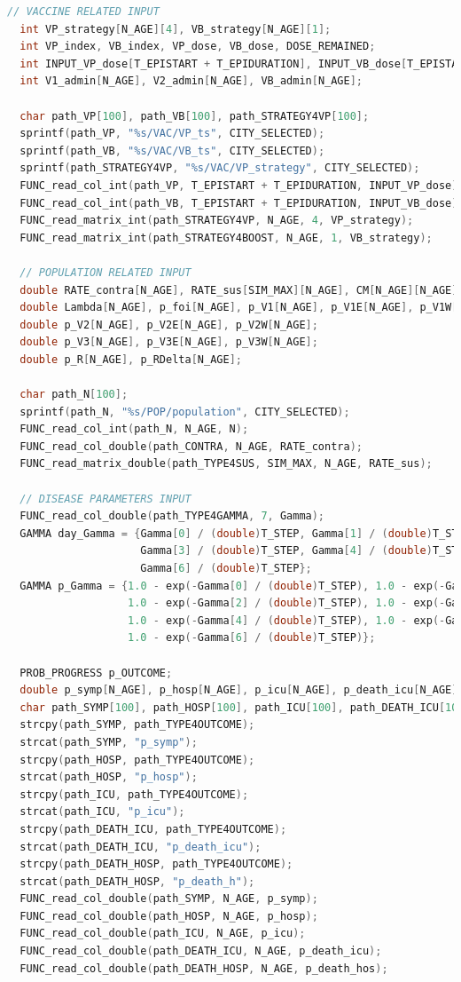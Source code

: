 \documentclass[bwprint]{gmcmthesis}
\numberwithin{figure}{section}
\begin{document}
\begin{lstlisting}[language=C]
  // VACCINE RELATED INPUT
  int VP_strategy[N_AGE][4], VB_strategy[N_AGE][1];
  int VP_index, VB_index, VP_dose, VB_dose, DOSE_REMAINED;
  int INPUT_VP_dose[T_EPISTART + T_EPIDURATION], INPUT_VB_dose[T_EPISTART + T_EPIDURATION];
  int V1_admin[N_AGE], V2_admin[N_AGE], VB_admin[N_AGE];

  char path_VP[100], path_VB[100], path_STRATEGY4VP[100];
  sprintf(path_VP, "%s/VAC/VP_ts", CITY_SELECTED);
  sprintf(path_VB, "%s/VAC/VB_ts", CITY_SELECTED);
  sprintf(path_STRATEGY4VP, "%s/VAC/VP_strategy", CITY_SELECTED);
  FUNC_read_col_int(path_VP, T_EPISTART + T_EPIDURATION, INPUT_VP_dose);
  FUNC_read_col_int(path_VB, T_EPISTART + T_EPIDURATION, INPUT_VB_dose);
  FUNC_read_matrix_int(path_STRATEGY4VP, N_AGE, 4, VP_strategy);
  FUNC_read_matrix_int(path_STRATEGY4BOOST, N_AGE, 1, VB_strategy);

  // POPULATION RELATED INPUT
  double RATE_contra[N_AGE], RATE_sus[SIM_MAX][N_AGE], CM[N_AGE][N_AGE], CM4Beta[N_AGE][N_AGE], Gamma[7];
  double Lambda[N_AGE], p_foi[N_AGE], p_V1[N_AGE], p_V1E[N_AGE], p_V1W[N_AGE];
  double p_V2[N_AGE], p_V2E[N_AGE], p_V2W[N_AGE];
  double p_V3[N_AGE], p_V3E[N_AGE], p_V3W[N_AGE];
  double p_R[N_AGE], p_RDelta[N_AGE];

  char path_N[100];
  sprintf(path_N, "%s/POP/population", CITY_SELECTED);
  FUNC_read_col_int(path_N, N_AGE, N);
  FUNC_read_col_double(path_CONTRA, N_AGE, RATE_contra);
  FUNC_read_matrix_double(path_TYPE4SUS, SIM_MAX, N_AGE, RATE_sus);

  // DISEASE PARAMETERS INPUT
  FUNC_read_col_double(path_TYPE4GAMMA, 7, Gamma);
  GAMMA day_Gamma = {Gamma[0] / (double)T_STEP, Gamma[1] / (double)T_STEP, Gamma[2] / (double)T_STEP,
                     Gamma[3] / (double)T_STEP, Gamma[4] / (double)T_STEP, Gamma[5] / (double)T_STEP,
                     Gamma[6] / (double)T_STEP};
  GAMMA p_Gamma = {1.0 - exp(-Gamma[0] / (double)T_STEP), 1.0 - exp(-Gamma[1] / (double)T_STEP),
                   1.0 - exp(-Gamma[2] / (double)T_STEP), 1.0 - exp(-Gamma[3] / (double)T_STEP),
                   1.0 - exp(-Gamma[4] / (double)T_STEP), 1.0 - exp(-Gamma[5] / (double)T_STEP),
                   1.0 - exp(-Gamma[6] / (double)T_STEP)};

  PROB_PROGRESS p_OUTCOME;
  double p_symp[N_AGE], p_hosp[N_AGE], p_icu[N_AGE], p_death_icu[N_AGE], p_death_hos[N_AGE];
  char path_SYMP[100], path_HOSP[100], path_ICU[100], path_DEATH_ICU[100], path_DEATH_HOSP[100];
  strcpy(path_SYMP, path_TYPE4OUTCOME);
  strcat(path_SYMP, "p_symp");
  strcpy(path_HOSP, path_TYPE4OUTCOME);
  strcat(path_HOSP, "p_hosp");
  strcpy(path_ICU, path_TYPE4OUTCOME);
  strcat(path_ICU, "p_icu");
  strcpy(path_DEATH_ICU, path_TYPE4OUTCOME);
  strcat(path_DEATH_ICU, "p_death_icu");
  strcpy(path_DEATH_HOSP, path_TYPE4OUTCOME);
  strcat(path_DEATH_HOSP, "p_death_h");
  FUNC_read_col_double(path_SYMP, N_AGE, p_symp);
  FUNC_read_col_double(path_HOSP, N_AGE, p_hosp);
  FUNC_read_col_double(path_ICU, N_AGE, p_icu);
  FUNC_read_col_double(path_DEATH_ICU, N_AGE, p_death_icu);
  FUNC_read_col_double(path_DEATH_HOSP, N_AGE, p_death_hos);


\end{lstlisting}
\end{document}

